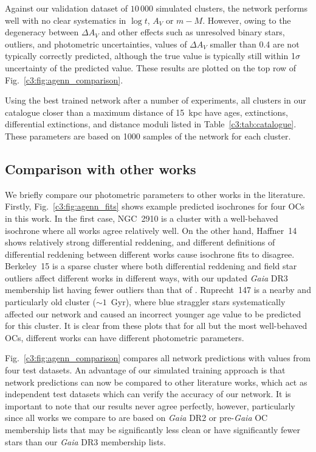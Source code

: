 Against our validation dataset of $10\,000$ simulated clusters, the network performs well with no clear systematics in $\log t$, $A_V$ or $m-M$. However, owing to the degeneracy between $\Delta A_V$ and other effects such as unresolved binary stars, outliers, and photometric uncertainties, values of $\Delta A_V$ smaller than 0.4 are not typically correctly predicted, although the true value is typically still within 1$\sigma$ uncertainty of the predicted value. These results are plotted on the top row of Fig.~\ref{c3:fig:agenn_comparison}.

 Using the best trained network after a number of experiments, all clusters in our catalogue closer than a maximum distance of 15~kpc have ages, extinctions, differential extinctions, and distance moduli listed in Table~\ref{c3:tab:catalogue}. These parameters are based on 1000 samples of the network for each cluster.

\subsection{Comparison with other works}

 We briefly compare our photometric parameters to other works in the literature. Firstly, Fig.~\ref{c3:fig:agenn_fits} shows example predicted isochrones for four OCs in this work. In the first case, NGC~2910 is a cluster with a well-behaved isochrone where all works agree relatively well. On the other hand, Haffner~14 shows relatively strong differential reddening, and different definitions of differential reddening between different works cause isochrone fits to disagree. Berkeley~15 is a sparse cluster where both differential reddening and field star outliers affect different works in different ways, with our updated \emph{Gaia} DR3 membership list having fewer outliers than that of \cite{cantat-gaudin_characterising_2018}. Ruprecht~147 is a nearby and particularly old cluster ($\sim1$~Gyr), where blue straggler stars systematically affected our network and caused an incorrect younger age value to be predicted for this cluster. It is clear from these plots that for all but the most well-behaved OCs, different works can have different photometric parameters.

Fig.~\ref{c3:fig:agenn_comparison} compares all network predictions with values from four test datasets. An advantage of our simulated training approach is that network predictions can now be compared to other literature works, which act as independent test datasets which can verify the accuracy of our network. It is important to note that our results never agree perfectly, however, particularly since all works we compare to are based on \emph{Gaia} DR2 or pre-\emph{Gaia} OC membership lists that may be significantly less clean or have significantly fewer stars than our \emph{Gaia} DR3 membership lists.

